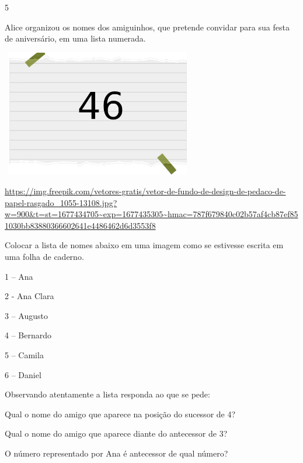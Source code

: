 \begin{escolha}
\begin{escolha}
\end{escolha}

\num{5}

Alice organizou os nomes dos amiguinhos, que pretende convidar para sua
festa de aniversário, em uma lista numerada.

\includegraphics[width=3.30833in,height=2.17391in]{media/image2.png}

\url{https://img.freepik.com/vetores-gratis/vetor-de-fundo-de-design-de-pedaco-de-papel-rasgado_1055-13108.jpg?w=900\&t=st=1677434705~exp=1677435305~hmac=787f679840c02b57af4cb87ef851030bb83880366602641e4486462d6d3553f8}

Colocar a lista de nomes abaixo em uma imagem como se estivesse escrita
em uma folha de caderno.

1 -- Ana

2 - Ana Clara

3 -- Augusto

4 -- Bernardo

5 -- Camila

6 -- Daniel

Observando atentamente a lista responda ao que se pede:

\begin{escolha}

\item
  Qual o nome do amigo que aparece na posição do sucessor de 4?

\item
  Qual o nome do amigo que aparece diante do antecessor de 3?

\item
  O número representado por Ana é antecessor de qual número?

\end{escolha}


\end{escolha}
